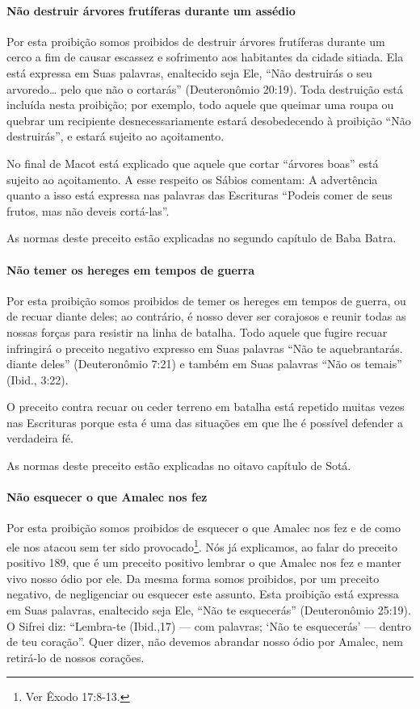 \paragraph{Não destruir árvores frutíferas durante um assédio}

Por esta proibição somos proibidos de destruir árvores frutíferas
durante um cerco a fim de causar escassez e sofrimento aos habitantes da
cidade sitiada. Ela está expressa em Suas palavras, enaltecido seja Ele,
``Não destruirás o seu arvoredo\ldots{} pelo que não o cortarás'' (Deuteronômio 20:19). Toda
destruição está incluída nesta proibição; por exemplo, todo aquele que
queimar uma roupa ou quebrar um recipiente desnecessariamente estará
desobedecendo à proibição ``Não destruirás'', e estará sujeito ao
açoitamento.

No final de Macot está explicado que aquele que cortar ``árvores boas''
está sujeito ao açoitamento. A esse respeito os Sábios comentam: A
advertência quanto a isso está expressa nas palavras das Escrituras
``Podeis comer de seus frutos, mas não deveis cortá-las''.

As normas deste preceito estão explicadas no segundo capítulo de Baba
Batra.

\paragraph{Não temer os hereges em tempos de guerra}

Por esta proibição somos proibidos de temer os hereges em tempos de
guerra, ou de recuar diante deles; ao contrário, é nosso dever ser
corajosos e reunir todas as nossas forças para resistir na linha de
batalha. Todo aquele que fugire recuar infringirá o preceito negativo
expresso em Suas palavras ``Não te aquebrantarás. diante deles''
(Deuteronômio 7:21) e também em Suas palavras ``Não os temais'' (Ibid.,
3:22).

O preceito contra recuar ou ceder terreno em batalha está repetido
muitas vezes nas Escrituras porque esta é uma das situações em que lhe é
possível defender a verdadeira fé.

As normas deste preceito estão explicadas no oitavo capítulo de Sotá.

\paragraph{Não esquecer o que Amalec nos fez}

Por esta proibição somos proibidos de esquecer o que Amalec nos fez e de
como ele nos atacou sem ter sido provocado\footnote{Ver Êxodo 17:8-13.}. Nós já
explicamos, ao falar do preceito positivo 189, que é um preceito
positivo lembrar o que Amalec nos fez e manter vivo nosso ódio por ele.
Da mesma forma somos proibidos, por um preceito negativo, de
negligenciar ou esquecer este assunto. Esta proibição está expressa em
Suas palavras, enaltecido seja Ele, ``Não te esquecerás'' (Deuteronômio
25:19). O Sifrei diz: ``Lembra-te (Ibid.,17) --- com palavras; `Não te
esquecerás' --- dentro de teu coração''. Quer dizer, não devemos
abrandar nosso ódio por Amalec, nem retirá-lo de nossos corações.

